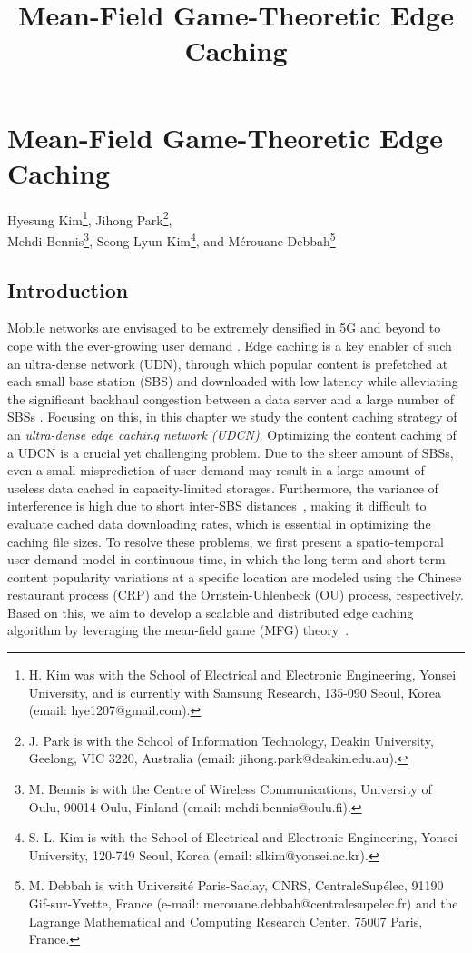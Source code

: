 \documentclass{book}
\title{Mean-Field Game-Theoretic Edge Caching}
\begin{document}
\chapter{Mean-Field Game-Theoretic Edge Caching}

Hyesung Kim\footnote{H. Kim was with the School of Electrical and Electronic Engineering, Yonsei University, and is currently with Samsung Research, 135-090 Seoul, Korea (email: hye1207@gmail.com).}, 
Jihong Park\footnote{J. Park is with the School of Information Technology, Deakin University, Geelong, VIC 3220, Australia (email: jihong.park@deakin.edu.au).},\\
Mehdi Bennis\footnote{M. Bennis is with the Centre of Wireless Communications, University of Oulu, 90014 Oulu, Finland (email: mehdi.bennis@oulu.fi).},
Seong-Lyun Kim\footnote{S.-L. Kim is with the School of Electrical and Electronic Engineering, Yonsei University, 120-749 Seoul, Korea (email: slkim@yonsei.ac.kr).},
and M\'erouane Debbah\footnote{M. Debbah is with Université Paris-Saclay, CNRS, CentraleSupélec, 91190 Gif-sur-Yvette, France (e-mail:
merouane.debbah@centralesupelec.fr) and the Lagrange Mathematical and
Computing Research Center, 75007 Paris, France.}


\section{Introduction}

Mobile networks are envisaged to be extremely densified in 5G and beyond to cope with the ever-growing user demand \cite{UDN_sur, JensUdnMag,Shim16,PetarURLLC:17}. Edge caching is a key enabler of such an ultra-dense network (UDN), through which popular content is prefetched at each small base station (SBS) and downloaded with low latency \cite{Living,caching_tradeoff:2016} while alleviating the significant backhaul congestion between a data server and a large number of SBSs \cite{caching_effect}. Focusing on this, in this chapter we study the content caching strategy of an \emph{ultra-dense edge caching network (UDCN)}. Optimizing the content caching of a UDCN is a crucial yet challenging problem. Due to the sheer amount of SBSs, even a small misprediction of user demand may result in a large amount of useless data cached in capacity-limited storages. Furthermore, the variance of interference is high due to short inter-SBS distances~\cite{interf_udn}, making it difficult to evaluate cached data downloading rates, which is essential in optimizing the caching file sizes. To resolve these problems, we first present a spatio-temporal user demand model in continuous time, in which the long-term and short-term content popularity variations at a specific location are modeled using the Chinese restaurant process (CRP) and the Ornstein-Uhlenbeck (OU) process, respectively. Based on this, we aim to develop a scalable and distributed edge caching algorithm by leveraging the mean-field game (MFG) theory~\cite{MF_Caine1,MF_Caines2}.
\end{document}
